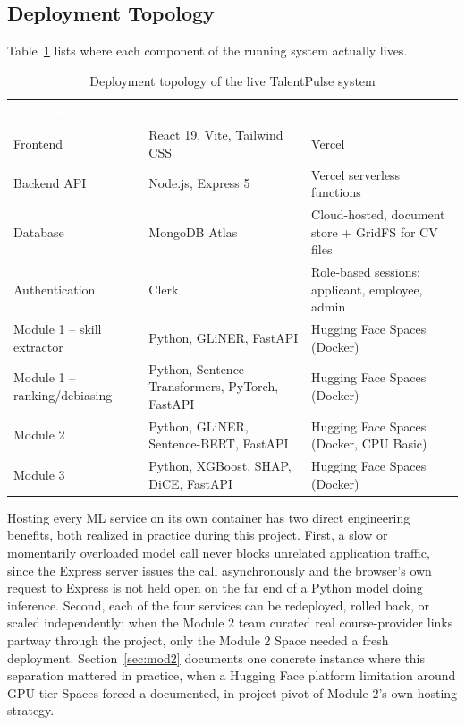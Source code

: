 \documentclass[11pt,a4paper]{article}
\newcommand{\hdrow}{\rowcolor{TPnavy}}
\newcommand{\hdtxt}[1]{\textcolor{white}{\bfseries #1}}
\begin{document}
\subsection{Deployment Topology}

Table~\ref{tab:deploy} lists where each component of the running system actually lives.

\begin{table}[H]
\centering
\caption{Deployment topology of the live TalentPulse system}
\label{tab:deploy}
\small
\begin{tabular}{p{3.2cm}p{5.8cm}p{5.4cm}}
\toprule
\hdrow \hdtxt{Component} & \hdtxt{Technology} & \hdtxt{Hosting} \\
\midrule
Frontend & React 19, Vite, Tailwind CSS & Vercel \\
\rowcolor{TPlight}
Backend API & Node.js, Express 5 & Vercel serverless functions \\
Database & MongoDB Atlas & Cloud-hosted, document store + GridFS for CV files \\
\rowcolor{TPlight}
Authentication & Clerk & Role-based sessions: applicant, employee, admin \\
Module 1 -- skill extractor & Python, GLiNER, FastAPI & Hugging Face Spaces (Docker) \\
\rowcolor{TPlight}
Module 1 -- ranking/debiasing & Python, Sentence-Transformers, PyTorch, FastAPI & Hugging Face Spaces (Docker) \\
Module 2 & Python, GLiNER, Sentence-BERT, FastAPI & Hugging Face Spaces (Docker, CPU Basic) \\
\rowcolor{TPlight}
Module 3 & Python, XGBoost, SHAP, DiCE, FastAPI & Hugging Face Spaces (Docker) \\
\bottomrule
\end{tabular}
\end{table}

Hosting every ML service on its own container has two direct engineering benefits, both realized in practice during this project. First, a slow or momentarily overloaded model call never blocks unrelated application traffic, since the Express server issues the call asynchronously and the browser's own request to Express is not held open on the far end of a Python model doing inference. Second, each of the four services can be redeployed, rolled back, or scaled independently; when the Module 2 team curated real course-provider links partway through the project, only the Module 2 Space needed a fresh deployment. Section~\ref{sec:mod2} documents one concrete instance where this separation mattered in practice, when a Hugging Face platform limitation around GPU-tier Spaces forced a documented, in-project pivot of Module 2's own hosting strategy.
\end{document}
